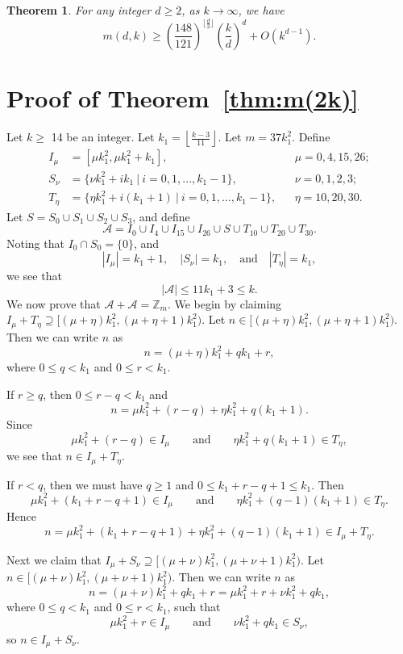 \documentclass[11pt]{article}
\newtheorem{theorem}{Theorem}
\theoremstyle{definition}
\def\Z{\mbox{$\mathbb Z$}}
\begin{document}
\begin{theorem}\label{thm:m(dk)}
For any integer $d \geq 2$, as $k \to \infty$, we have 
\[
m(d,k) \geq \left(\frac{148}{121}\right)^{\lfloor \frac{d}{2}\rfloor}\left(\frac{k}{d}\right)^d + O(k^{d-1}).
\]
\end{theorem}
 
 
 
\section{Proof of Theorem~\ref{thm:m(2k)}}
 

Let $k \geq$ 14 be an integer. Let $\displaystyle k_1 = \left \lfloor \frac{k - 3}{11} \right \rfloor$. Let $m = 37k_1^2$.  Define 
\begin{align*}
I_\mu &= [\mu k_1^2, \mu k_1^2 + k_1],
&&\mu = 0, 4, 15, 26; \\
S_\nu &= \{\nu k_1^2 + ik_1 \ |\  i = 0 , 1, ... , k_1 - 1\},
&&\nu = 0, 1, 2, 3;\\
T_{\eta} &= \{\eta k_1^2+ i(k_1 + 1) \ |\   i = 0 , 1, ... , k_1 -1\},
&&\eta = 10, 20, 30.
\end{align*}
 Let $S= S_{0} \cup S_{1} \cup S_{2} \cup S_{3}$, and
define
\[
\mathscr{A}=I_0\cup I_4\cup I_{15}\cup I_{26}\cup S\cup T_{10}\cup T_{20}\cup T_{30}.
\]
Noting  that $I_0\cap S_0=\{0\}$, and 
\[
|I_\mu| = k_1 + 1,\quad 
|S_\nu| = k_1,\quad\text{and}\quad
|T_\eta| = k_1,
\]
we see that 
\[
|\mathscr{A|} \leq 11k_1 + 3 \leq k.
\]  
We now prove that $\mathscr{A}+\mathscr{A}=\Z_m$.
We begin by claiming $I_{\mu}+T_{\eta}\supseteq[(\mu + \eta )k_1^2 ,  (\mu + \eta  + 1)k_1^2)$. Let $n \in[(\mu + \eta )k_1^2 ,  (\mu + \eta  + 1)k_1^2)$.
Then we can write $n$ as 
\[
n = (\mu + \eta ) k_1^2 + qk_1 + r,
\]
where $0 \leq q < k_1$ and $0 \leq r < k_1$.

If $r \geq q$, then $0\le r-q<k_{1}$ and
\[
n = \mu k_1^2 +  (r - q)+ \eta k_1^2 + q(k_1+1).
\]
 Since 
 \[
 \mu k_1^2 + (r - q) \in I_\mu\qquad\text{and}\qquad \eta k_1^2 +q(k_1+1) \in T_\eta,
 \]
we see that $n \in I_{\mu}+T_{\eta}$. 

If $r < q$, then we must have $q \geq 1$ and $0\le k_{1}+r-q+1\le k_{1}$. Then
\[
\mu k_1^2 + (k_1 + r - q + 1) \in I_\mu \qquad \text{and}\qquad
\eta k_1^2 + (q - 1)(k_1 + 1) \in T_\eta.
\]
 Hence
\[
n = \mu k_1^2 + (k_1 + r - q + 1)+\eta k_1^2 + (q - 1)(k_1 + 1) \in I_{\mu}+T_{\eta}.
\]
 

Next we claim that  $I_{\mu}+S_{\nu}\supseteq[(\mu + \nu )k_1^2 ,  (\mu + \nu  + 1)k_1^2)$. Let $n \in[(\mu + \nu )k_1^2 ,  (\mu + \nu  + 1)k_1^2)$.
Then we can write $n$ as 
\[
n = (\mu + \nu ) k_1^2 + qk_1 + r = \mu k_1^2 + r+\nu k_1^2 + qk_1,
\]
where  $0 \leq q < k_1$ and $0 \leq r < k_1$, such that 
\[
\mu k_1^2 + r \in I_\mu \qquad\text{and}\qquad\nu k_1^2 + qk_1 \in S_\nu,
\]
 so $n \in I_{\mu}+S_{\nu}$. 
\end{document}
